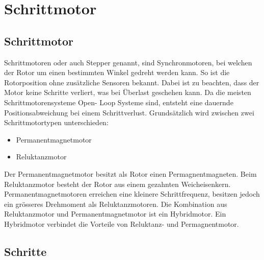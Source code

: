 \ifSTANDALONE
    \section{Schrittmotor} \label{sec:stepper}
\fi
\ifEMBED
    \subsection{Schrittmotor} \label{sec:stepper}
\fi
\ifEMBED
    \BLDCcollab
\fi
    Schrittmotoren oder auch Stepper genannt, sind Synchronmotoren, bei 
    welchen der Rotor um einen bestimmten Winkel gedreht werden kann. So ist 
    die Rotorposition ohne zusätzliche Sensoren bekannt. Dabei ist zu 
    beachten, dass der Motor keine Schritte verliert, was bei Überlast 
    geschehen kann. Da die meisten Schrittmotorensysteme Open- Loop Systeme 
    sind, entsteht eine dauernde Positionsabweichung bei einem Schrittverlust. 
    Grundsätzlich wird zwischen zwei Schrittmotortypen unterschieden: 
    \begin{itemize}
       	\item Permanentmagnetmotor
       	\item Reluktanzmotor
    \end{itemize} 
    Der Permanentmagnetmotor besitzt als Rotor einen Permagnentmagneten. Beim 
    Reluktanzmotor besteht der Rotor aus einem gezahnten Weicheisenkern. 
    Permanentmagnetmotoren erreichen eine kleinere Schrittfrequenz, besitzen 
    jedoch ein grösseres Drehmoment als Reluktanzmotoren. Die Kombination 
    aus Reluktanzmotor und Permanentmagnetmotor ist ein Hybridmotor. Ein 
    Hybridmotor verbindet die Vorteile von Reluktanz- und Permagnentmotor. 

\ifSTANDALONE
    \subsection{Schritte} \label{sec:steps}
\fi
\ifEMBED
